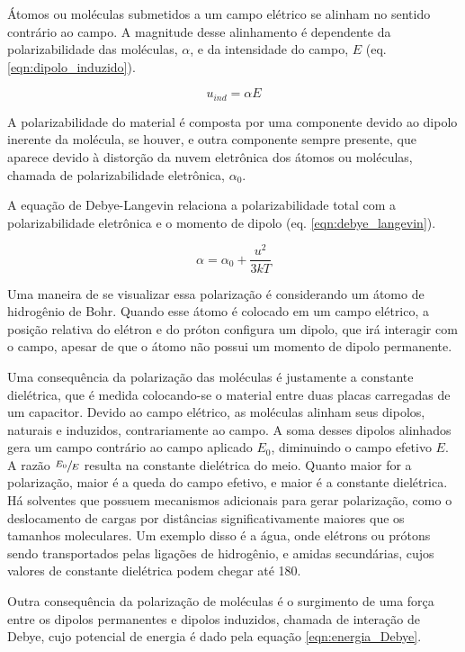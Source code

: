 	Átomos ou moléculas submetidos a um campo elétrico se alinham no sentido contrário ao campo. A magnitude desse alinhamento é dependente da polarizabilidade das moléculas, \(\alpha\), e da intensidade do campo, \(E\)  (eq. \ref{eqn:dipolo_induzido}).
	
	\begin{equation}
		u_{ind} = \alpha E
		\label{eqn:dipolo_induzido}
	\end{equation}
	
	A polarizabilidade do material é composta por uma componente devido ao dipolo inerente da molécula, se houver, e outra componente sempre presente, que aparece devido à distorção da nuvem eletrônica dos átomos ou moléculas, chamada de polarizabilidade eletrônica, \(\alpha_0\).
	
	A equação de Debye-Langevin relaciona a polarizabilidade total com a polarizabilidade eletrônica e o momento de dipolo (eq. \ref{eqn:debye_langevin}).
	
	\begin{equation}
		\alpha = \alpha _ { 0 } + \dfrac{u ^ { 2 }}{ 3 k T }
		\label{eqn:debye_langevin}
	\end{equation}
	
	Uma maneira de se visualizar essa polarização é considerando um átomo de hidrogênio de Bohr. Quando esse átomo é colocado em um campo elétrico, a posição relativa do elétron e do próton configura um dipolo, que irá interagir com o campo, apesar de que o átomo não possui um momento de dipolo permanente.
	
	Uma consequência da polarização das moléculas é justamente a constante dielétrica, que é medida colocando-se o material entre duas placas carregadas de um capacitor. Devido ao campo elétrico, as moléculas alinham seus dipolos, naturais e induzidos, contrariamente ao campo. A soma desses dipolos alinhados gera um campo contrário ao campo aplicado \(E_0\), diminuindo o campo efetivo \(E\). A razão \(\sfrac{E_0}{E}\) resulta na constante dielétrica do meio. Quanto maior for a polarização, maior é a queda do campo efetivo, e maior é a constante dielétrica. Há solventes que possuem mecanismos adicionais para gerar polarização, como o deslocamento de cargas por distâncias significativamente maiores que os tamanhos moleculares. Um exemplo disso é a água, onde elétrons ou prótons sendo transportados pelas ligações de hidrogênio, e amidas secundárias, cujos valores de constante dielétrica podem chegar até 180.

	Outra consequência da polarização de moléculas é o surgimento de uma força entre os dipolos permanentes e dipolos induzidos, chamada de interação de Debye, cujo potencial de energia é dado pela equação \ref{eqn:energia_Debye}.
	
